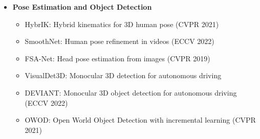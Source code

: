 \begin{itemize}
\begin{itemize}
    \end{itemize}
    \item \textbf{Pose Estimation and Object Detection}
    \begin{itemize}
        \item HybrIK: Hybrid kinematics for 3D human pose (CVPR 2021)
        \item SmoothNet: Human pose refinement in videos (ECCV 2022)
        \item FSA-Net: Head pose estimation from images (CVPR 2019)
        \item VisualDet3D: Monocular 3D detection for autonomous driving
        \item DEVIANT: Monocular 3D object detection for autonomous driving (ECCV 2022)
        \item OWOD: Open World Object Detection with incremental learning (CVPR 2021)
    \end{itemize}
\end{itemize}

